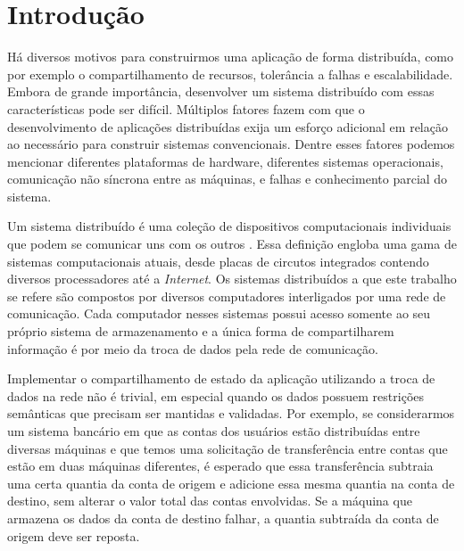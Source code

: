 \documentclass[11pt,twoside,a4paper]{book}
\begin{document}
\listoffigures
\listofalgorithms

\mainmatter

\fancyhead[RE,LO]{\thesection}

\singlespacing              %

\chapter{Introdução}
\label{chap:introducao}
Há diversos motivos para construirmos uma aplicação de forma distribuída, como por exemplo o compartilhamento de recursos, tolerância a falhas e 
escalabilidade. Embora de grande importância, desenvolver um sistema distribuído com essas características pode ser difícil. Múltiplos fatores 
fazem com que o desenvolvimento de aplicações distribuídas exija um esforço adicional em relação ao necessário para construir sistemas 
convencionais. Dentre esses fatores podemos mencionar diferentes plataformas de hardware, diferentes sistemas operacionais, comunicação não 
síncrona entre as máquinas, e falhas e conhecimento parcial do sistema.

Um sistema distribuído é uma coleção de dispositivos computacionais individuais que podem se comunicar uns com os outros 
\cite{tanenbaum, distributed_computing}. Essa definição engloba uma gama de
sistemas computacionais atuais, desde placas de circutos integrados contendo diversos processadores até a \emph{Internet}. Os sistemas 
distribuídos a que este trabalho se refere são compostos por diversos computadores interligados por uma rede de comunicação. Cada computador 
nesses sistemas possui acesso somente ao seu próprio sistema de armazenamento e a única forma de compartilharem informação é por meio da troca 
de dados pela rede de comunicação.

Implementar o compartilhamento de estado da aplicação utilizando a troca de
dados na rede não é trivial, em especial quando os dados possuem restrições semânticas que precisam ser mantidas e validadas. Por exemplo, se 
considerarmos um sistema bancário em que as contas dos usuários estão
distribuídas entre diversas máquinas e que temos uma solicitação de transferência entre contas que estão em duas máquinas diferentes, é esperado 
que essa transferência subtraia uma certa quantia da conta de origem e adicione essa mesma quantia na conta de destino, sem alterar o valor 
total das contas envolvidas. Se a máquina que armazena os dados da conta de
destino falhar, a quantia subtraída da conta de origem deve ser reposta.
\end{document}
